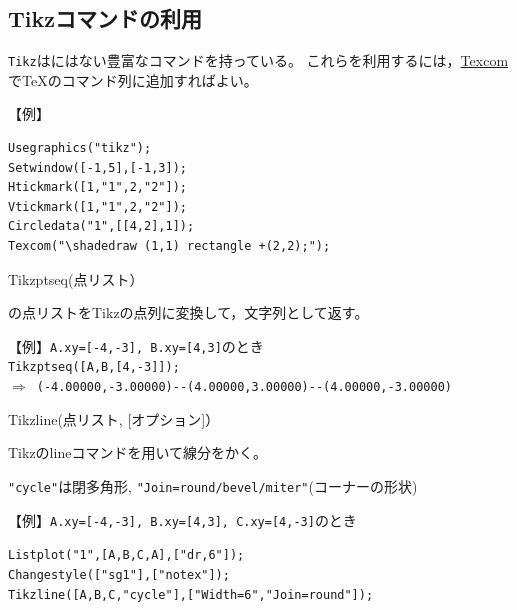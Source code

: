 \documentclass[papersize,a4paper,12pt,uplatex]{jsarticle}
\begin{document}
\subsection{Tikzコマンドの利用}

\hypertarget{tikztexcom}{}

\verb|Tikz|は\ketcindy にはない豊富なコマンドを持っている。
これらを利用するには，\hyperlink{texcom}{Texcom}で\TeX のコマンド列に追加すればよい。

【例】
\begin{verbatim}
Usegraphics("tikz");
Setwindow([-1,5],[-1,3]);
Htickmark([1,"1",2,"2"]);
Vtickmark([1,"1",2,"2"]);
Circledata("1",[[4,2],1]);
Texcom("\shadedraw (1,1) rectangle +(2,2);");
\end{verbatim}

\begin{center}

\end{center}

\begin{description}

\hypertarget{tikzptseq}{}
\item[関数]Tikzptseq(点リスト）
\item[機能]\ketcindy の点リストをTikzの点列に変換して，文字列として返す。

\vspace{3mm}
【例】\verb|A.xy=[-4,-3], B.xy=[4,3]|のとき\\
\hspace*{5mm}\verb|Tikzptseq([A,B,[4,-3]]);|\\
\hspace*{10mm}$\Rightarrow$\ \verb|(-4.00000,-3.00000)--(4.00000,3.00000)--(4.00000,-3.00000)|

\hypertarget{tikzline}{}
\item[関数]Tikzline(点リスト, [オプション]）
\item[機能]Tikzのlineコマンドを用いて線分をかく。
\item[説明]\verb|"cycle"|は閉多角形, \verb|"Join=round/bevel/miter"|(コーナーの形状)

\vspace{3mm}
【例】\verb|A.xy=[-4,-3], B.xy=[4,3], C.xy=[4,-3]|のとき

\hspace*{5mm}\verb|Listplot("1",[A,B,C,A],["dr,6"]);|\\
\hspace*{5mm}\verb|Changestyle(["sg1"],["notex"]);|\\
\hspace*{5mm}\verb|Tikzline([A,B,C,"cycle"],["Width=6","Join=round"]);|

\vspace{-15mm}

\begin{center}
\scalebox{0.5}{}
\end{center}


\end{description}
\end{document}
